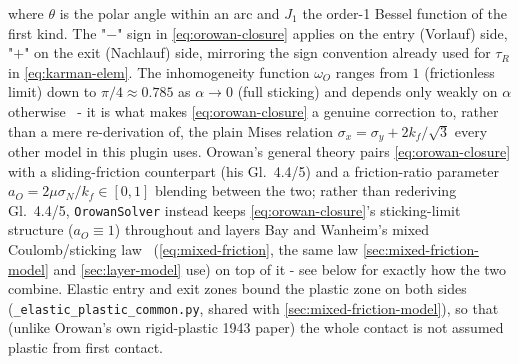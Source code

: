 \documentclass[11pt]{PyRollDocs}
\begin{document}
    where $\theta$ is the polar angle within an arc and $J_1$ the order-1 Bessel function of the first kind. The "$-$" sign in \autoref{eq:orowan-closure} applies on the entry (Vorlauf) side, "$+$" on the exit (Nachlauf) side, mirroring the sign convention already used for $\tau_R$ in \autoref{eq:karman-elem}. The inhomogeneity function $\omega_O$ ranges from $1$ (frictionless limit) down to $\pi/4 \approx 0.785$ as $\alpha \to 0$ (full sticking) and depends only weakly on $\alpha$ otherwise~\cite[Abb.~4.4/4]{Overhagen2018} - it is what makes \autoref{eq:orowan-closure} a genuine correction to, rather than a mere re-derivation of, the plain Mises relation $\sigma_x = \sigma_y + 2k_f/\sqrt3$ every other model in this plugin uses. Orowan's general theory pairs \autoref{eq:orowan-closure} with a sliding-friction counterpart (his Gl.~4.4/5) and a friction-ratio parameter $a_O = 2\mu\sigma_N/k_f \in [0,1]$ blending between the two; rather than rederiving Gl.~4.4/5, \lstinline{OrowanSolver} instead keeps \autoref{eq:orowan-closure}'s sticking-limit structure ($a_O \equiv 1$) throughout and layers Bay and Wanheim's mixed Coulomb/sticking law~\cite{BayWanheim1976} (\autoref{eq:mixed-friction}, the same law \autoref{sec:mixed-friction-model} and \autoref{sec:layer-model} use) on top of it - see below for exactly how the two combine. Elastic entry and exit zones bound the plastic zone on both sides (\lstinline{_elastic_plastic_common.py}, shared with \autoref{sec:mixed-friction-model}), so that (unlike Orowan's own rigid-plastic 1943 paper) the whole contact is not assumed plastic from first contact.
\end{document}
